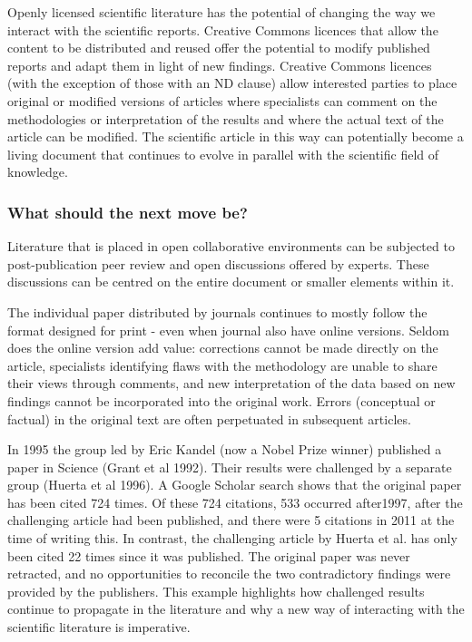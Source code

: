\documentclass[final,authoryear,3p]{elsarticle-open-drafting}
\begin{document}
Openly licensed scientific literature has the potential of changing the way we interact with the scientific reports. Creative 
Commons licences that allow the content to be distributed and reused offer the potential to modify published reports and adapt 
them in light of new findings. Creative Commons licences (with the exception of those with an ND clause) allow interested parties 
to place original or modified versions of articles where specialists can comment on the methodologies or interpretation of the 
results and where the actual text of the article can be modified. The scientific article in this way can potentially become a living 
document that continues to evolve in parallel with the scientific field of knowledge. 

\subsubsection{What should the next move be?}

Literature that is placed in open collaborative environments can be subjected to post-publication peer review and open 
discussions offered by experts. These discussions can be centred on the entire document or smaller elements within it. 

The individual paper distributed by journals continues to mostly follow the format designed for print - even when journal also 
have online versions. Seldom does the online version add value: corrections cannot be made directly on the article, specialists 
identifying flaws with the methodology are unable to share their views through comments, and new interpretation of the data 
based on new findings cannot be incorporated into the original work. Errors (conceptual or factual) in the original text are often 
perpetuated in subsequent articles.

In 1995 the group led by Eric Kandel (now a Nobel Prize winner) published a paper in Science (Grant et al 1992). Their results 
were challenged by a separate group (Huerta et al 1996). A Google Scholar search shows that the original paper has been cited 
724 times. Of these 724 citations, 533 occurred after1997, after the challenging article had been published, and there were 5 
citations in 2011 at the time of writing this. In contrast, the challenging article by Huerta et al. has only been cited 22 times since it 
was published. The original paper was never retracted, and no opportunities to reconcile the two contradictory findings were 
provided by the publishers. This example highlights how challenged results continue to propagate in the literature and why a 
new way of interacting with the scientific literature is imperative. 
\end{document}
